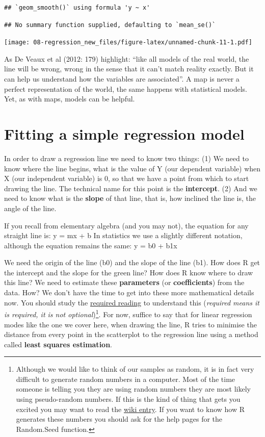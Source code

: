 \documentclass[
]{book}
\begin{document}
\begin{verbatim}
## `geom_smooth()` using formula 'y ~ x'
\end{verbatim}

\begin{verbatim}
## No summary function supplied, defaulting to `mean_se()`
\end{verbatim}

\texttt{[image: 08-regression\_new\_files/figure-latex/unnamed-chunk-11-1.pdf]}

As De Veaux et al (2012: 179) highlight: ``like all models of the real world, the line will be wrong, wrong in the sense that it can't match reality exactly. But it can help us understand how the variables are associated''. A map is never a perfect representation of the world, the same happens with statistical models. Yet, as with maps, models can be helpful.

\hypertarget{fitting-a-simple-regression-model}{%
\section{Fitting a simple regression model}\label{fitting-a-simple-regression-model}}

In order to draw a regression line we need to know two things:
(1) We need to know where the line begins, what is the value of Y (our dependent variable) when X (our independent variable) is 0, so that we have a point from which to start drawing the line. The technical name for this point is the \textbf{intercept}.
(2) And we need to know what is the \textbf{slope} of that line, that is, how inclined the line is, the angle of the line.

If you recall from elementary algebra (and you may not), the equation for any straight line is:
y = mx + b
In statistics we use a slightly different notation, although the equation remains the same:
y = b0 + b1x

We need the origin of the line (b0) and the slope of the line (b1). How does R get the intercept and the slope for the green line? How does R know where to draw this line? We need to estimate these \textbf{parameters} (or \textbf{coefficients}) from the data. How? We don't have the time to get into these more mathematical details now. You should study the \href{http://link.springer.com/chapter/10.1007/978-1-4614-7138-7_3}{required reading} to understand this (\emph{required means it is required, it is not optional})\footnote{Although we would like to think of our samples as random, it is in fact very difficult to generate random numbers in a computer. Most of the time someone is telling you they are using random numbers they are most likely using pseudo-random numbers. If this is the kind of thing that gets you excited you may want to read the \href{http://en.wikipedia.org/wiki/Random_number_generation\#.22True.22_random_numbers_vs._pseudo-random_numbers}{wiki entry}. If you want to know how R generates these numbers you should ask for the help pages for the Random.Seed function.}. For now, suffice to say that for linear regression modes like the one we cover here, when drawing the line, R tries to minimise the distance from every point in the scatterplot to the regression line using a method called \textbf{least squares estimation}.
\end{document}
